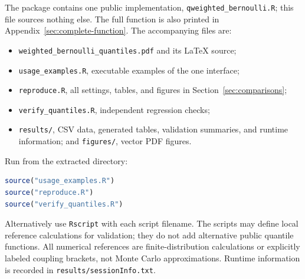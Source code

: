 \documentclass[11pt,letterpaper]{article}
\numberwithin{equation}{section}
\theoremstyle{definition}
\theoremstyle{remark}
\begin{document}
The package contains one public implementation,
\texttt{qweighted\_bernoulli.R}; this file sources nothing else.
The full function is also printed in Appendix~\ref{sec:complete-function}.
The accompanying files are:
\begin{itemize}
\item \texttt{weighted\_bernoulli\_quantiles.pdf} and its LaTeX source;
\item \texttt{usage\_examples.R}, executable examples of the one interface;
\item \texttt{reproduce.R}, all settings, tables, and figures in
Section~\ref{sec:comparisons};
\item \texttt{verify\_quantiles.R}, independent regression checks;
\item \texttt{results/}, CSV data, generated tables, validation summaries,
and runtime information; and \texttt{figures/}, vector PDF figures.
\end{itemize}
Run from the extracted directory:
\begin{lstlisting}[language=R]
source("usage_examples.R")
source("reproduce.R")
source("verify_quantiles.R")
\end{lstlisting}
Alternatively use \texttt{Rscript} with each script filename. The scripts
may define local reference calculations for validation; they do not add
alternative public quantile functions. All numerical references are
finite-distribution calculations or explicitly labeled coupling brackets,
not Monte Carlo approximations. Runtime information is recorded in
\texttt{results/sessionInfo.txt}.
\end{document}
